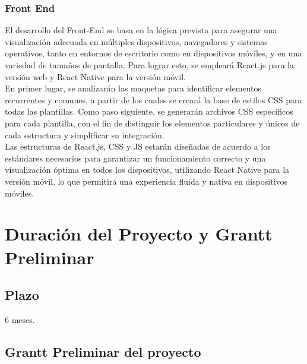 \documentclass{report}
\begin{document}
					\subsubsection{Front End}	
					El desarrollo del Front-End se basa en la lógica prevista para asegurar una visualización adecuada en múltiples dispositivos, navegadores y sistemas operativos, tanto en entornos de escritorio como en dispositivos móviles, y en una variedad de tamaños de pantalla. Para lograr esto, se empleará React.js para la versión web y React Native para la versión móvil.\\
					\break
					En primer lugar, se analizarán las maquetas para identificar elementos recurrentes y comunes, a partir de los cuales se creará la base de estilos CSS para todas las plantillas. Como paso siguiente, se generarán archivos CSS específicos para cada plantilla, con el fin de distinguir los elementos particulares y únicos de cada estructura y simplificar su integración.\\
					\break
					Las estructuras de React.js, CSS y JS estarán diseñadas de acuerdo a los estándares necesarios para garantizar un funcionamiento correcto y una visualización óptima en todos los dispositivos, utilizando React Native para la versión móvil, lo que permitirá una experiencia fluida y nativa en dispositivos móviles.
		\section{Duración del Proyecto y Grantt Preliminar}	
			\subsection{Plazo}
				6 meses.
			\subsection{Grantt Preliminar del proyecto}
	
\end{document}
